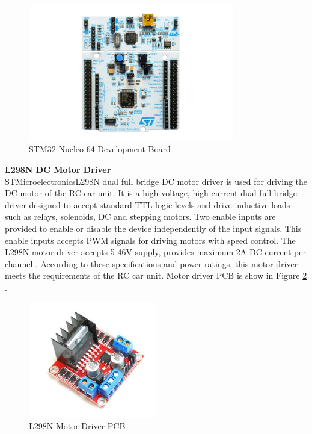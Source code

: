 \begin{figure}[!htbp]
    \centering
    \includegraphics[width=0.8\textwidth]{Imgs/nucleo64.jpg}
    \caption{\label{fig:nucleo64_board}STM32 Nucleo-64 Development Board \cite{One}}
\end{figure}

\noindent \textbf{L298N DC Motor Driver} \\
STMicroelectronics\texttrademark\;L298N dual full bridge DC motor driver is used for driving the DC motor of the RC car unit. It is a high voltage, high current dual full-bridge driver designed to accept standard TTL logic levels and drive inductive loads such as relays, solenoids, DC and stepping motors. Two enable inputs are provided to enable or disable the device independently of the input signals. This enable inputs accepts PWM signals for driving motors with speed control. The L298N motor driver accepts 5-46V supply, provides maximum 2A DC current per channel \cite{Two}. According to these specifications and power ratings, this motor driver meets the requirements of the RC car unit. Motor driver PCB is show in Figure \ref{fig:l298n_pcb} .

\begin{figure}[!htbp]
    \centering
    \includegraphics[width=0.5\textwidth]{Imgs/l298n.png}
    \caption{\label{fig:l298n_pcb}L298N Motor Driver PCB}
\end{figure}


